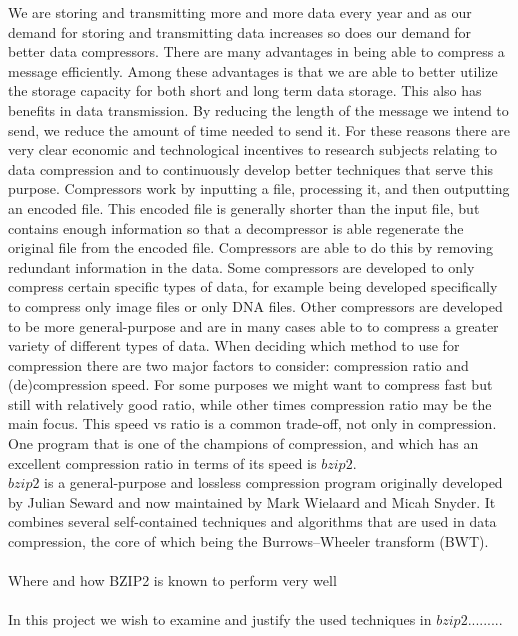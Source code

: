 \documentclass{article}
\begin{document}
We are storing and transmitting more and more data every year and as our demand for storing and transmitting data increases so does our demand for better data compressors. %
There are many advantages in being able to compress a message efficiently. Among these advantages is that we are able to better utilize the storage capacity for both short and long term data storage. This also has benefits in data transmission. By reducing the length of the message we intend to send, we reduce the amount of time needed to send it.
For these reasons there are very clear economic and technological incentives to research subjects relating to data compression and to continuously develop better techniques that serve this purpose.
\newline
Compressors work by inputting a file, processing it, and then outputting an encoded file. This encoded file is generally shorter than the input file, but contains enough information so that a decompressor is able regenerate the original file from the encoded file. Compressors are able to do this by removing redundant information in the data. %
Some compressors are developed to only compress certain specific types of data, for example being developed specifically to compress only image files or only DNA files. 
Other compressors are developed to be more general-purpose and are in many cases able to to compress a greater variety of different types of data.
When deciding which method to use for compression there are two major factors to consider: compression ratio and (de)compression speed. %
For some purposes we might want to compress fast but still with relatively good ratio, while other times compression ratio may be the main focus. This speed vs ratio is a common trade-off, not only in compression.
One program that is one of the champions of compression, and which has an excellent compression ratio in terms of its speed is \(bzip2\). %
\\
\(bzip2\) is a general-purpose and lossless compression program originally developed by Julian Seward and now maintained by Mark Wielaard and Micah Snyder. %
It combines several self-contained techniques and algorithms that are used in data compression, the core of which being the Burrows–Wheeler transform (BWT).
\\
\\
Where and how BZIP2 is known to perform very well
\\
\\
In this project we wish to examine and justify the used techniques in \(bzip2\).........
\end{document}
